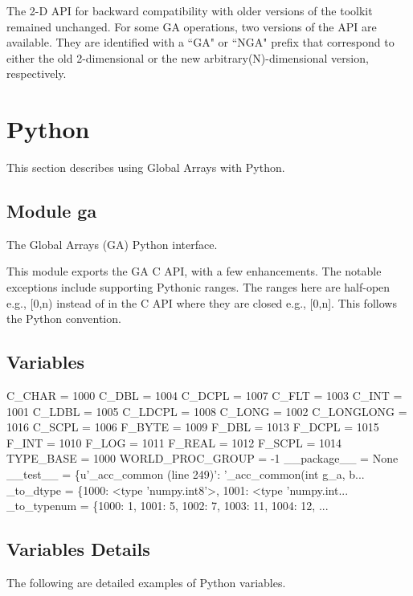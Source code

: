 \documentclass[12pt]{article}
\begin{document}
The 2-D API for backward compatibility with older versions of the toolkit remained unchanged. For some GA operations, two versions of the API are available. They are identified with a ``GA" or ``NGA" prefix that correspond to either the old 2-dimensional or the new arbitrary(N)-dimensional version, respectively. 

\section{Python}
This section describes using Global Arrays with Python.

\subsection{Module ga}
The Global Arrays (GA) Python interface.

This module exports the GA C API, with a few enhancements. The notable exceptions include supporting Pythonic ranges. The ranges here are half-open e.g., [0,n) instead of in the C API where they are closed e.g., [0,n]. This follows the Python convention.

\subsection{Variables}
\begin{codeseg}
C_CHAR = 1000
C_DBL = 1004
C_DCPL = 1007
C_FLT = 1003
C_INT = 1001
C_LDBL = 1005
C_LDCPL = 1008
C_LONG = 1002
C_LONGLONG = 1016
C_SCPL = 1006
F_BYTE = 1009
F_DBL = 1013
F_DCPL = 1015
F_INT = 1010
F_LOG = 1011
F_REAL = 1012
F_SCPL = 1014
TYPE_BASE = 1000
WORLD_PROC_GROUP = -1
__package__ = None
__test__ = \{u'_acc_common (line 249)': '_acc_common(int g_a, b...
_to_dtype = \{1000: <type 'numpy.int8'>, 1001: <type 'numpy.int...
_to_typenum = \{1000: 1, 1001: 5, 1002: 7, 1003: 11, 1004: 12, ...
\end{codeseg}

\subsection{Variables Details}
The following are detailed examples of Python variables. 
\end{document}
